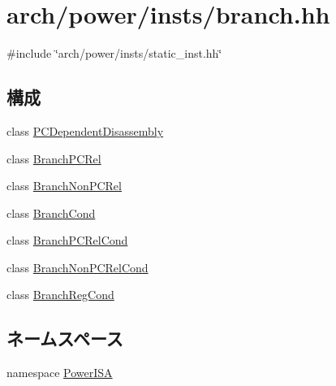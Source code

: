 \hypertarget{power_2insts_2branch_8hh}{
\section{arch/power/insts/branch.hh}
\label{power_2insts_2branch_8hh}
}
{\ttfamily \#include \char`\"{}arch/power/insts/static\_\-inst.hh\char`\"{}}\par
\subsection*{構成}
\begin{DoxyCompactItemize}
\item 
class \hyperlink{classPowerISA_1_1PCDependentDisassembly}{PCDependentDisassembly}
\item 
class \hyperlink{classPowerISA_1_1BranchPCRel}{BranchPCRel}
\item 
class \hyperlink{classPowerISA_1_1BranchNonPCRel}{BranchNonPCRel}
\item 
class \hyperlink{classPowerISA_1_1BranchCond}{BranchCond}
\item 
class \hyperlink{classPowerISA_1_1BranchPCRelCond}{BranchPCRelCond}
\item 
class \hyperlink{classPowerISA_1_1BranchNonPCRelCond}{BranchNonPCRelCond}
\item 
class \hyperlink{classPowerISA_1_1BranchRegCond}{BranchRegCond}
\end{DoxyCompactItemize}
\subsection*{ネームスペース}
\begin{DoxyCompactItemize}
\item 
namespace \hyperlink{namespacePowerISA}{PowerISA}
\end{DoxyCompactItemize}
